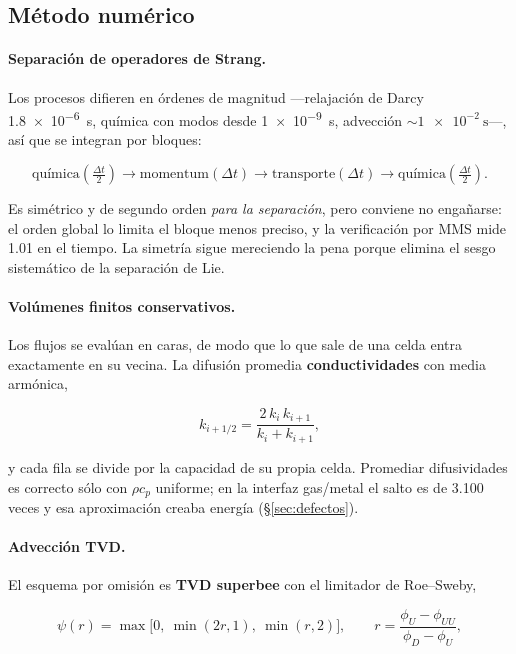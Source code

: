 \subsection{Método numérico}

\paragraph{Separación de operadores de Strang.} Los procesos difieren en órdenes
de magnitud ---relajación de Darcy \SI{1.8e-6}{\second}, química con modos desde
\SI{1e-9}{\second}, advección $\sim\SI{1e-2}{\second}$---, así que se integran
por bloques:

\begin{equation}
\text{química}\!\left(\tfrac{\Delta t}{2}\right) \rightarrow
\text{momentum}(\Delta t) \rightarrow
\text{transporte}(\Delta t) \rightarrow
\text{química}\!\left(\tfrac{\Delta t}{2}\right).
\end{equation}

Es simétrico y de segundo orden \emph{para la separación}, pero conviene no
engañarse: el orden global lo limita el bloque menos preciso, y la verificación
por MMS mide \num{1.01} en el tiempo. La simetría sigue mereciendo la pena
porque elimina el sesgo sistemático de la separación de Lie.

\paragraph{Volúmenes finitos conservativos.} Los flujos se evalúan en caras, de
modo que lo que sale de una celda entra exactamente en su vecina. La difusión
promedia \textbf{conductividades} con media armónica,

\begin{equation}
k_{i+1/2} = \frac{2\,k_i\,k_{i+1}}{k_i + k_{i+1}},
\end{equation}

y cada fila se divide por la capacidad de su propia celda. Promediar
difusividades es correcto sólo con $\rho c_p$ uniforme; en la interfaz gas/metal
el salto es de 3.100 veces y esa aproximación creaba energía
(\S\ref{sec:defectos}).

\paragraph{Advección TVD.} El esquema por omisión es \textbf{TVD superbee} con
el limitador de Roe--Sweby,

\begin{equation}
\psi(r) = \max\!\big[0,\ \min(2r,1),\ \min(r,2)\big],
\qquad
r = \frac{\phi_{U} - \phi_{UU}}{\phi_{D} - \phi_{U}},
\end{equation}

